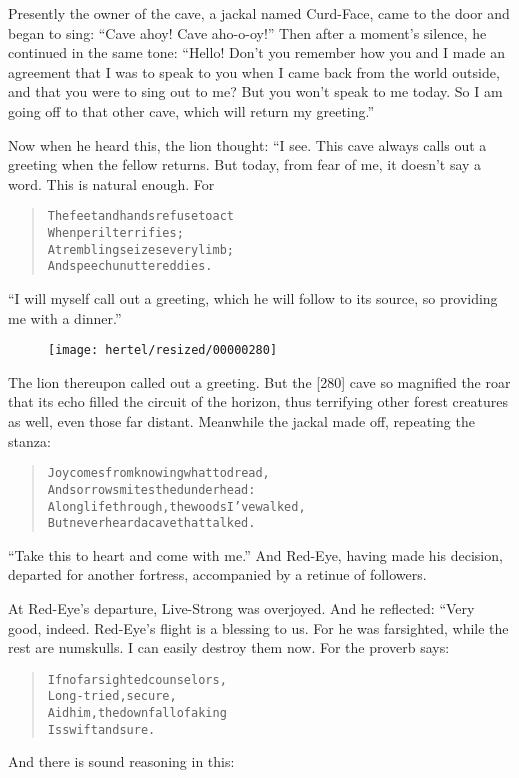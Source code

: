 \documentclass[article, twoside, 10pt]{memoir}
\renewenvironment{verbatim}{%
\begin{quote}%
\vskip -10pt%
\begin{alltt}\normalfont\small}{\end{alltt}%
\end{quote}%
\vskip -10pt
} %
\begin{document}
Presently the owner of the cave, a jackal named Curd-Face, came to
the door and began to sing: ``Cave ahoy! Cave aho-o-oy!'' Then
after a moment's silence, he continued in the same tone:
``Hello! Don't you remember how you and I made an agreement that I was to speak to you when I came back from the world outside, and that you were to sing out to me? But you won't speak to me today. So I am going off to that other cave, which will return my greeting.''

Now when he heard this, the lion thought: “I see. This cave always
calls out a greeting when the fellow returns. But today, from fear
of me, it doesn't say a word. This is natural enough. For

\begin{verbatim}
The feet and hands refuse to act
    When peril terrifies;
A trembling seizes every limb;
    And speech unuttered dies.
\end{verbatim}
``I will myself call out a greeting, which he will follow to its source, so providing me with a dinner.''

\begin{figure}[p]\texttt{[image: hertel/resized/00000280]}\end{figure}The lion thereupon called out a greeting. But the [280] cave so
magnified the roar that its echo filled the circuit of the horizon,
thus terrifying other forest creatures as well, even those far
distant. Meanwhile the jackal made off, repeating the stanza:

\begin{verbatim}
Joy comes from knowing what to dread,
And sorrow smites the dunderhead:
A long life through, the woods I've walked,
But never heard a cave that talked.
\end{verbatim}
``Take this to heart and come with me.'' And Red-Eye, having made
his decision, departed for another fortress, accompanied by a
retinue of followers.

At Red-Eye's departure, Live-Strong was overjoyed. And he
reflected: “Very good, indeed. Red-Eye's flight is a blessing to
us. For he was farsighted, while the rest are numskulls. I can
easily destroy them now. For the proverb says:

\begin{verbatim}
If no farsighted counselors,
    Long-tried, secure,
Aid him, the downfall of a king
    Is swift and sure.
\end{verbatim}
And there is sound reasoning in this:
\end{document}

